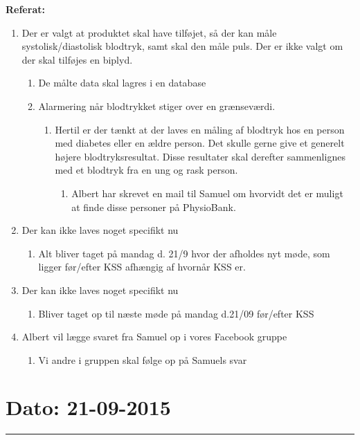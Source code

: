 \textbf{Referat:}
\begin{enumerate}
\item Der er valgt at produktet skal have tilføjet, så der kan måle systolisk/diastolisk blodtryk, samt skal den måle puls. Der er ikke valgt om der skal tilføjes en biplyd. 
\begin{enumerate}
\item De målte data skal lagres i en database
\item Alarmering når blodtrykket stiger over en grænseværdi.
\begin{enumerate}
\item Hertil er der tænkt at der laves en måling af blodtryk hos en person med diabetes eller en ældre person. Det skulle gerne give et generelt højere blodtryksresultat. Disse resultater skal derefter sammenlignes med et blodtryk fra en ung og rask person.
\begin{enumerate}
\item Albert har skrevet en mail til Samuel om hvorvidt det er muligt at finde disse personer på PhysioBank.
\end{enumerate}
\end{enumerate}
\end{enumerate}
\item Der kan ikke laves noget specifikt nu
\begin{enumerate}
\item Alt bliver taget på mandag d. 21/9 hvor der afholdes nyt møde, som ligger før/efter KSS afhængig af hvornår KSS er.
\end{enumerate}
\item Der kan ikke laves noget specifikt nu
\begin{enumerate}
\item Bliver taget op til næste møde på mandag d.21/09 før/efter KSS
\end{enumerate}
\item Albert vil lægge svaret fra Samuel op i vores Facebook gruppe
\begin{enumerate}
\item Vi andre i gruppen skal følge op på Samuels svar
\end{enumerate}
\end{enumerate}



\section{Dato: 21-09-2015}
\hrule

